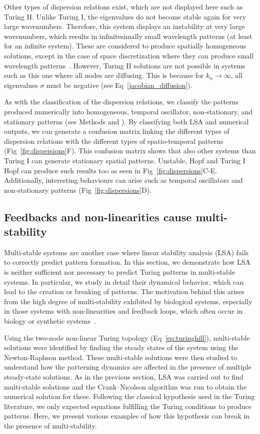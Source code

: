 \documentclass[10pt,letterpaper]{article}
\begin{document}
Other types of dispersion relations exist, which are not displayed here such as Turing II. Unlike Turing I, the eigenvalues do not become stable again for very large wavenumbers.
Therefore, this system displays an instability at very large wavenumbers, which results in infinitesimally small wavelength patterns (at least for an infinite system). These are considered to produce spatially homogeneous solutions, except in the case of space discretization where they can produce small wavelength patterns~\cite{Wang2022}.
However, Turing II solutions are not possible in systems such as this one where all nodes are diffusing.
This is because for $k_n \rightarrow \infty$, all eigenvalues $\sigma$ must be negative (see Eq~\ref{jacobian_diffusion}).

As with the classification of the dispersion relations, we classify the patterns produced numerically into homogeneous, temporal oscillator, non-stationary, and stationary patterns (see Methods and ).
By classifying both LSA and numerical outputs, we can generate a confusion matrix linking the different types of dispersion relations with the different types of spatio-temporal patterns (Fig~\ref{fig:dispersions}F). This confusion matrix shows that also other systems than Turing I can generate stationary spatial patterns. Unstable, Hopf and Turing I Hopf can produce such results too as seen in Fig~\ref{fig:dispersions}C-E. Additionally, interesting behaviours can arise such as temporal oscillators and non-stationary patterns (Fig~\ref{fig:dispersions}D).


\subsection*{Feedbacks and non-linearities cause multi-stability}

Multi-stable systems are another case where linear stability analysis (LSA) fails to correctly predict pattern formation.  In this section, we demonstrate how LSA is neither sufficient 
nor necessary to predict Turing patterns in multi-stable systems. In particular, we study in detail their dynamical behavior, which can lead to the creation or breaking of patterns.
The motivation behind this arises from the high degree of multi-stability exhibited by biological systems, especially in those systems with non-linearities and feedback loops, which often occur in biology or synthetic systems~\cite{pham2020complexity, leite2009multistability}.

Using the two-node non-linear Turing topology (Eq~\ref{eq:turinghill}), multi-stable solutions were identified by finding the steady states of the system using the Newton-Raphson method. These multi-stable solutions were then studied to understand how the patterning dynamics are affected in the presence of multiple steady-state solutions.
As in the previous section, LSA was carried out to find multi-stable solutions and the Crank–Nicolson algorithm was run to obtain the numerical solution for these.
Following the classical hypothesis used in the Turing literature, we only expected equations fulfilling the Turing conditions to produce patterns.
Here, we present various examples of how this hypothesis can break in the presence of multi-stability.
\end{document}
